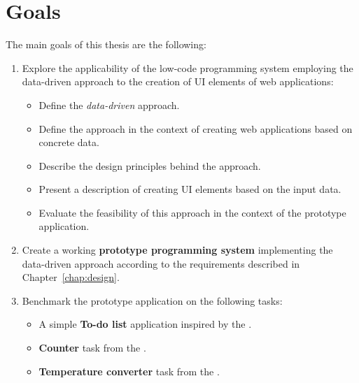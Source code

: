 \section*{Goals}
The main goals of this thesis are the following:
\begin{enumerate}
	\item Explore the applicability of the low-code programming system employing the data-driven approach to the creation of UI elements of web applications:
	      \begin{itemize}
		      \item Define the \emph{data-driven} approach.
		      \item Define the approach in the context of creating web applications based on concrete data.
		      \item Describe the design principles behind the approach.
		      \item Present a description of creating UI elements based on the input data.
		      \item Evaluate the feasibility of this approach in the context of the prototype application.
	      \end{itemize}
	\item Create a working \textbf{prototype programming system} implementing the data-driven approach according to the requirements described in Chapter~\ref{chap:design}.
	\item Benchmark the prototype application on the following tasks:
	      \begin{itemize}
		      \item A simple \textbf{To-do list} application inspired by the \citet{TodoMVC}.
		      \item \textbf{Counter} task from the \citet{7GUIs-web}.
		      \item \textbf{Temperature converter} task from the \citet{7GUIs-web}.
	      \end{itemize}
\end{enumerate}

\newpage
